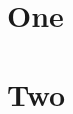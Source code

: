 \documentclass{amsart}
\begin{document}
\section{One}\label{ed-0100}

\section{Two}\label{ed-0101}

\end{document}
